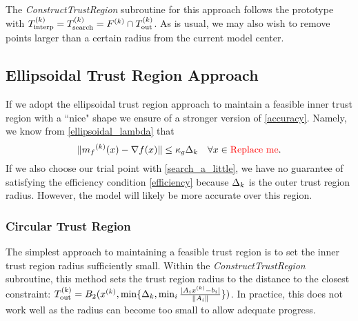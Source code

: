 The \emph{ConstructTrustRegion} subroutine for this approach follows the prototype with ${T_{\text{interp}}^{(k)}} = {T_{\text{search}}^{(k)}} = {F}^{(k)} \cap {T_{\text{out}}^{(k)}} $.
As is usual, we may also wish to remove points larger than a certain radius from the current model center.






\subsection{Ellipsoidal Trust Region Approach}

If we adopt the ellipsoidal trust region approach to maintain a feasible inner trust region with a ``nice" shape we ensure of a stronger version of \cref{accuracy}.
Namely, we know from \cref{ellipsoidal_lambda} that 
\[
    \|{{m}_f}^{(k)}(x) - \nabla f(x) \| \le \kappa_g \Delta_{k} \quad \forall x \in \color{red} \text{Replace me} \color{black}.
\]
If we also choose our trial point with \cref{search_a_little}, we have no guarantee of satisfying the efficiency condition \cref{efficiency} because $\Delta_k$ is the outer trust region radius.
However, the model will likely be more accurate over this region.


\subsubsection{Circular Trust Region}
The simplest approach to maintaining a feasible trust region is to set the inner trust region radius sufficiently small.
Within the \emph{ConstructTrustRegion} subroutine, this method sets the trust region radius to the distance to the closest constraint:
${T_{\text{out}}^{(k)}} = B_2({x}^{(k)}, \min\{\Delta_k, \min_{i}\frac{|A_i{x}^{(k)} - b_i|}{\|A_i\|} \})$.
In practice, this does not work well as the radius can become too small to allow adequate progress.

